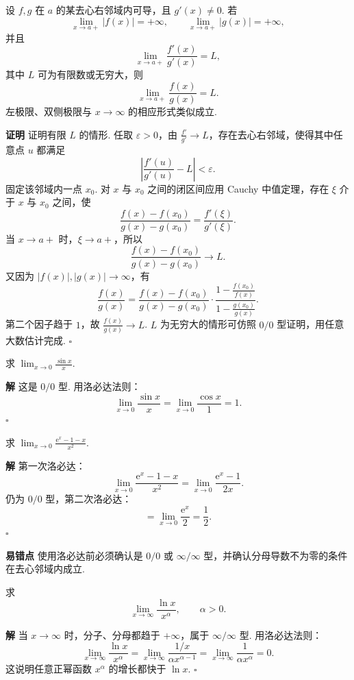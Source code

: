 \documentclass[fontset=fandol]{ctexart}
\newenvironment{proofdetail}{\par\noindent\textbf{证明}\quad}{\hfill$\square$\par\vspace{0.8em}}
\newenvironment{solution}{\par\noindent\textbf{解}\quad}{\hfill$\square$\par\vspace{0.8em}}
\newenvironment{warning}{\par\noindent\textbf{易错点}\quad}{\par\vspace{0.8em}}
\newcommand{\ee}{\mathrm{e}}
\begin{document}
\begin{theorem}
设 $f,g$ 在 $a$ 的某去心右邻域内可导，且 $g'(x)\neq0$. 若
\[
\lim_{x\to a+}|f(x)|=+\infty,\qquad
\lim_{x\to a+}|g(x)|=+\infty,
\]
并且
\[
\lim_{x\to a+}\frac{f'(x)}{g'(x)}=L,
\]
其中 $L$ 可为有限数或无穷大，则
\[
\lim_{x\to a+}\frac{f(x)}{g(x)}=L.
\]
左极限、双侧极限与 $x\to\infty$ 的相应形式类似成立.
\end{theorem}
\begin{proofdetail}
证明有限 $L$ 的情形. 任取 $\varepsilon>0$，由 $\frac{f'}{g'}\to L$，存在去心右邻域，使得其中任意点 $u$ 都满足
\[
\left|\frac{f'(u)}{g'(u)}-L\right|<\varepsilon.
\]
固定该邻域内一点 $x_0$. 对 $x$ 与 $x_0$ 之间的闭区间应用 Cauchy 中值定理，存在 $\xi$ 介于 $x$ 与 $x_0$ 之间，使
\[
\frac{f(x)-f(x_0)}{g(x)-g(x_0)}=\frac{f'(\xi)}{g'(\xi)}.
\]
当 $x\to a+$ 时，$\xi\to a+$，所以
\[
\frac{f(x)-f(x_0)}{g(x)-g(x_0)}\to L.
\]
又因为 $|f(x)|,|g(x)|\to\infty$，有
\[
\frac{f(x)}{g(x)}
=\frac{f(x)-f(x_0)}{g(x)-g(x_0)}
\cdot
\frac{1-\frac{f(x_0)}{f(x)}}{1-\frac{g(x_0)}{g(x)}}.
\]
第二个因子趋于 $1$，故 $\frac{f(x)}{g(x)}\to L$. $L$ 为无穷大的情形可仿照 $0/0$ 型证明，用任意大数估计完成.
\end{proofdetail}

\begin{example}[$0/0$ 型]
求 $\displaystyle\lim_{x\to0}\frac{\sin x}{x}$.
\end{example}
\begin{solution}
这是 $0/0$ 型. 用洛必达法则：
\[
\lim_{x\to0}\frac{\sin x}{x}=\lim_{x\to0}\frac{\cos x}{1}=1.
\]
\end{solution}

\begin{example}[多次使用]
求 $\displaystyle\lim_{x\to0}\frac{\ee^x-1-x}{x^2}$.
\end{example}
\begin{solution}
第一次洛必达：
\[
\lim_{x\to0}\frac{\ee^x-1-x}{x^2}
=\lim_{x\to0}\frac{\ee^x-1}{2x}.
\]
仍为 $0/0$ 型，第二次洛必达：
\[
=\lim_{x\to0}\frac{\ee^x}{2}=\frac12.
\]
\end{solution}
\begin{warning}
使用洛必达前必须确认是 $0/0$ 或 $\infty/\infty$ 型，并确认分母导数不为零的条件在去心邻域内成立.
\end{warning}

\begin{example}
求
\[
\lim_{x\to\infty}\frac{\ln x}{x^\alpha},\qquad \alpha>0.
\]
\end{example}
\begin{solution}
当 $x\to\infty$ 时，分子、分母都趋于 $+\infty$，属于 $\infty/\infty$ 型. 用洛必达法则：
\[
\lim_{x\to\infty}\frac{\ln x}{x^\alpha}
=\lim_{x\to\infty}\frac{1/x}{\alpha x^{\alpha-1}}
=\lim_{x\to\infty}\frac{1}{\alpha x^\alpha}=0.
\]
这说明任意正幂函数 $x^\alpha$ 的增长都快于 $\ln x$.
\end{solution}
\end{document}

